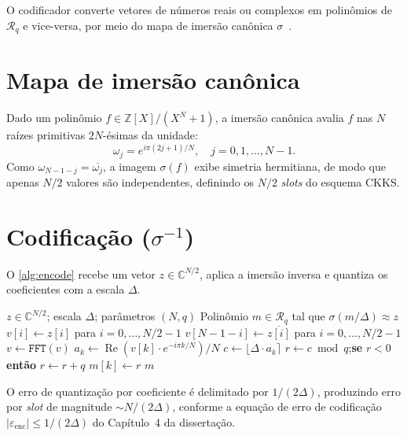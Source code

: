 \documentclass[11pt,a4paper]{report}
\newcommand{\Rq}{\mathcal{R}_q}
\begin{document}
O codificador converte vetores de números reais ou complexos em polinômios de $\Rq$ e
vice-versa, por meio do mapa de imersão canônica $\sigma$~\cite{Cheon2017}.

\section{Mapa de imersão canônica}
\label{sec:canonical_embedding}

Dado um polinômio $f \in \mathbb{Z}[X]/(X^N+1)$, a imersão canônica avalia $f$ nas $N$
raízes primitivas $2N$-ésimas da unidade:
\begin{equation}
  \omega_j = e^{i\pi(2j+1)/N}, \quad j = 0, 1, \ldots, N-1.
  \label{eq:roots}
\end{equation}
Como $\omega_{N-1-j} = \overline{\omega_j}$, a imagem $\sigma(f)$ exibe simetria
hermitiana, de modo que apenas $N/2$ valores são independentes, definindo os
$N/2$ \emph{slots} do esquema CKKS.

\section{Codificação ($\sigma^{-1}$)}
\label{sec:encode}

O \cref{alg:encode} recebe um vetor $z \in \mathbb{C}^{N/2}$, aplica a imersão inversa
e quantiza os coeficientes com a escala $\Delta$.

\begin{algorithm}[ht]
\caption{\texttt{encode}: codificação canônica CKKS}
\label{alg:encode}
\begin{algorithmic}[1]
\Require $z \in \mathbb{C}^{N/2}$;\; escala $\Delta$;\; parâmetros $(N, q)$
\Ensure Polinômio $m \in \Rq$ tal que $\sigma(m/\Delta) \approx z$
\State $v[i] \gets z[i]$ para $i = 0, \ldots, N/2-1$
\State $v[N-1-i] \gets \overline{z[i]}$ para $i = 0, \ldots, N/2-1$
\State $v \gets \texttt{FFT}(v)$
  \State $a_k \gets \operatorname{Re}(v[k] \cdot e^{-i\pi k/N}) / N$
  \State $c \gets \lfloor \Delta \cdot a_k \rceil$
  \State $r \gets c \bmod q$;\quad \textbf{se} $r < 0$ \textbf{então} $r \gets r + q$
  \State $m[k] \gets r$
\EndFor
\State \Return $m$
\end{algorithmic}
\end{algorithm}

O erro de quantização por coeficiente é delimitado por $1/(2\Delta)$, produzindo erro
por \emph{slot} de magnitude $\sim N/(2\Delta)$, conforme a equação de erro de
codificação $|\varepsilon_{\text{enc}}| \leq 1/(2\Delta)$ do Capítulo~4 da dissertação.
\end{document}
